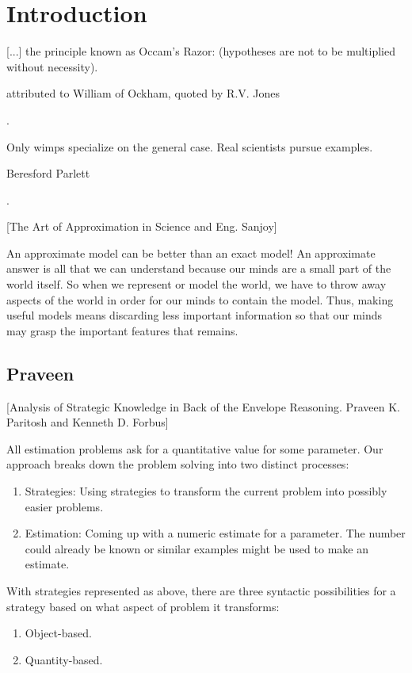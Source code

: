\section{Introduction}
\newcommand{\lpos}{x} %
\newcommand{\lvel}{v} %
%
\epigraph{[...] the principle known as Occam's Razor:  (hypotheses are not to be multiplied without necessity).}{attributed to William of Ockham, quoted by R.V. Jones}{\citep[p.95]{gibbings:2011}.}
%
\epigraph{Only wimps specialize on the general case. Real scientists pursue examples.}{Beresford Parlett}{\citep{berry:1995}.}

[The Art of Approximation in Science and Eng. Sanjoy]

An approximate model can be better than an exact model! An approximate answer is all that we can understand because our minds are a small part of the world itself. So when we represent or model the world, we have to throw away aspects of the world in order for our minds to contain the model. Thus, making useful models means discarding less important information so that our minds may grasp the important features that remains.


\subsection{Praveen}
[Analysis of Strategic Knowledge in Back of the Envelope Reasoning. Praveen K. Paritosh and Kenneth D. Forbus]

All estimation problems ask for a quantitative value for some parameter. Our approach breaks down the problem solving into two distinct processes:
%
\begin{enumerate}
\item Strategies: Using strategies to transform the current problem into possibly easier problems.
\item Estimation: Coming up with a numeric estimate for a parameter. The number could already be known or similar examples might be used to make an estimate.
\end{enumerate}

With strategies represented as above, there are three syntactic possibilities for a strategy based on what aspect of problem it transforms:
%
\begin{enumerate}
\item Object-based.
\item Quantity-based.
\end{enumerate}

